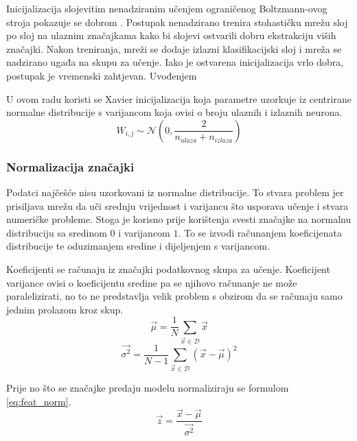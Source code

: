 \documentclass[times, utf8, numeric, diplomski]{fer}
\def\normal{\mathcal{N}}
\def\dataset{\mathcal{D}}
\def\TODO#1{\noindent\textcolor{red}{TODO: \textit{#1}}\newline}
\def\todo#1{\TODO{#1}}
\begin{document}
Inicijalizacija slojevitim nenadziranim učenjem ograničenog Boltzmann-ovog stroja  pokazuje se dobrom \citep{relu6}. Postupak nenadzirano trenira stohastičku mrežu sloj po sloj na ulaznim značajkama kako bi slojevi ostvarili dobru ekstrakciju viših značajki. Nakon treniranja, mreži se dodaje izlazni klasifikacijski sloj i mreža se nadzirano ugađa na skupu za učenje. Iako je ostvarena inicijalizacija vrlo dobra, postupak je vremenski zahtjevan. Uvođenjem 


U ovom radu koristi se Xavier inicijalizacija koja parametre uzorkuje iz centrirane normalne distribucije s varijancom koja ovisi o broju ulaznih i izlaznih neurona. \citep{xavier}
\begin{equation}
W_{i,j} \sim \normal(0, \frac{2}{n_{ulaza}+n_{izlaza}})
\end{equation}

\subsubsection{Normalizacija značajki}
Podatci najčešće nisu uzorkovani iz normalne distribucije. To stvara problem jer prisiljava mrežu da uči srednju vrijednost i varijancu što usporava učenje i stvara numeričke probleme. Stoga je korisno prije korištenja svesti značajke na normalnu distribuciju sa sredinom $0$ i varijancom $1$. To se izvodi računanjem koeficijenata distribucije te oduzimanjem sredine i dijeljenjem s varijancom.

Koeficijenti se računaju iz značajki podatkovnog skupa za učenje. Koeficijent varijance ovisi o koeficijentu sredine pa se njihovo računanje ne može paralelizirati, no to ne predstavlja velik problem s obzirom da se računaju samo jednim prolazom kroz skup.
\begin{equation}
\vec{\mu} = \frac{1}{N} \sum_{\vec{x}\in \dataset} \vec{x}
\end{equation}
\begin{equation}
\vec{\sigma^2} = \frac{1}{N-1} \sum_{\vec{x}\in \dataset} (\vec{x}-\vec{\mu})^2
\end{equation}

Prije no što se značajke predaju modelu normaliziraju se formulom \eqref{eq:feat_norm}.
\begin{equation}
\label{eq:feat_norm}
\vec{z} = \frac{\vec{x} - \vec{\mu}}{\vec{\sigma^2}}
\end{equation}
\end{document}
